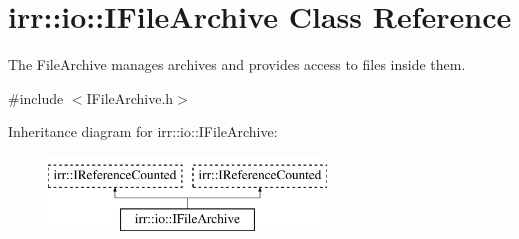 \hypertarget{classirr_1_1io_1_1IFileArchive}{}\section{irr\+:\+:io\+:\+:I\+File\+Archive Class Reference}
\label{classirr_1_1io_1_1IFileArchive}


The File\+Archive manages archives and provides access to files inside them.  




{\ttfamily \#include $<$I\+File\+Archive.\+h$>$}

Inheritance diagram for irr\+:\+:io\+:\+:I\+File\+Archive\+:\begin{figure}[H]
\begin{center}
\leavevmode
\includegraphics[height=2.000000cm]{classirr_1_1io_1_1IFileArchive}
\end{center}
\end{figure}
